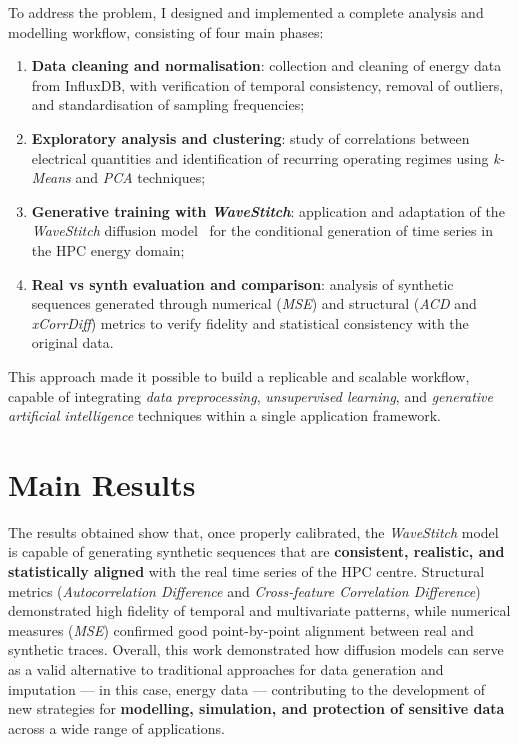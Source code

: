 To address the problem, I designed and implemented a complete analysis and modelling workflow, consisting of four main phases:

\begin{enumerate}
  \item \textbf{Data cleaning and normalisation}: collection and cleaning of energy data from InfluxDB, with verification of temporal consistency, removal of outliers, and standardisation of sampling frequencies;
  \item \textbf{Exploratory analysis and clustering}: study of correlations between electrical quantities and identification of recurring operating regimes using \emph{k-Means} and \emph{PCA} techniques;
  \item \textbf{Generative training with \emph{WaveStitch}}: application and adaptation of the \emph{WaveStitch} diffusion model~\cite{wavestitch} for the conditional generation of time series in the HPC energy domain;
  \item \textbf{Real vs synth evaluation and comparison}: analysis of synthetic sequences generated through numerical (\emph{MSE}) and structural (\emph{ACD} and \emph{xCorrDiff}) metrics to verify fidelity and statistical consistency with the original data.
\end{enumerate}
This approach made it possible to build a replicable and scalable workflow, capable of integrating \emph{data preprocessing}, \emph{unsupervised learning}, and \emph{generative artificial intelligence} techniques within a single application framework.

\section*{Main Results}

The results obtained show that, once properly calibrated, the \emph{WaveStitch} model is capable of generating synthetic sequences that are \textbf{consistent, realistic, and statistically aligned} with the real time series of the HPC centre.  
Structural metrics (\emph{Autocorrelation Difference} and \emph{Cross-feature Correlation Difference}) demonstrated high fidelity of temporal and multivariate patterns, while numerical measures (\emph{MSE}) confirmed good point-by-point alignment between real and synthetic traces.
Overall, this work demonstrated how diffusion models can serve as a valid alternative to traditional approaches for data generation and imputation --- in this case, energy data --- contributing to the development of new strategies for \textbf{modelling, simulation, and protection of sensitive data} across a wide range of applications.